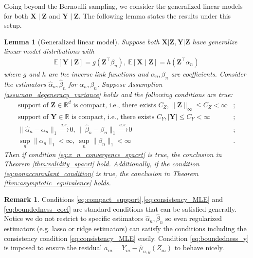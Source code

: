 \documentclass[12pt]{article}
\newtheorem{lemma}{Lemma}
\theoremstyle{definition}
\newtheorem{remark}{Remark}
\newcommand{\E}{\mathbb E}								%
\newcommand{\prx}{\bm X}								%
\newcommand{\prz}{\bm Z}								%
\newcommand{\srz}{Z}									%
\newcommand{\pry}{{\bm Y}}								%
\newcommand{\sry}{Y}									%
\begin{document}
Going beyond the Bernoulli sampling, we consider the generalized linear models for both $\prx\mid\prz$ and $\pry\mid\prz$. The following lemma states the results under this setup.


\begin{lemma}[Generalized linear model]\label{lem:reduction_to_MLE}
  Suppose both $\prx|\prz,\pry|\prz$ have generalize linear model distributions with
  \begin{align*}
    \E[\pry\mid \prz]=g(\prz^\top \beta_{n}),\ \E[\prx \mid \prz]=h(\prz^\top \alpha_{n})
  \end{align*}
  where $g$ and $h$ are the inverse link functions and $\alpha_{n},\beta_{n}$ are coefficients. Consider the estimators $\widehat{\alpha}_n,\widehat{\beta}_{n}$ for $\alpha_{n},\beta_{n}$. Suppose Assumption \ref{assu:non_degeneracy_variance} holds and the following conditions are true:
  \begin{align}
    \text{support of $\prz\in\mathbb{R}^d$ is compact, i.e., there exists }C_Z, \|\prz\|_{\infty}\leq C_Z<\infty &
    \label{eq:compact_support}\tag{SuppZ};\\
    \text{support of $\pry\in\mathbb{R}$ is compact, i.e., there exists }C_Y, |\pry|\leq C_Y<\infty &
    \label{eq:boundedness_y}\tag{SuppY};\\
    \|\widehat{\alpha}_n-\alpha_n\|_1\overset{a.s.}{\rightarrow}0,\ \|\widehat{\beta}_n-\beta_n\|_1\overset{a.s.}{\rightarrow}0&
    \label{eq:consistency_MLE}\tag{CML};\\
    \sup_{n}\|\alpha_n\|_1<\infty,\ \sup_{n}\|\beta_n\|_1<\infty &
    \label{eq:boundedness_coef}\tag{UBC}.
  \end{align}
  Then if condition \eqref{eq:x_n_convergence_spacrt} is true, the conclusion in Theorem \ref{thm:validity_spacrt} hold. Additionally, if the condition \eqref{eq:nonaccumulant_condition} is true, the conclusion in Theorem \ref{thm:asymptotic_equivalence} holds. 
\end{lemma}


\begin{remark}
  Conditions \eqref{eq:compact_support},\eqref{eq:consistency_MLE} and \eqref{eq:boundedness_coef} are standard conditions that can be satisfied generally. Notice we do not restrict to specific estimators $\widehat{\alpha}_n,\widehat{\beta}_n$ so even regularized estimators (e.g. lasso or ridge estimators) can satisfy the conditions including the consistency condition \eqref{eq:consistency_MLE} easily. Condition \eqref{eq:boundedness_y} is imposed to ensure the residual $a_{in}=\sry_{in}-\widehat{\mu}_{n,y}(\srz_{in})$ to behave nicely.
\end{remark}
\end{document}
